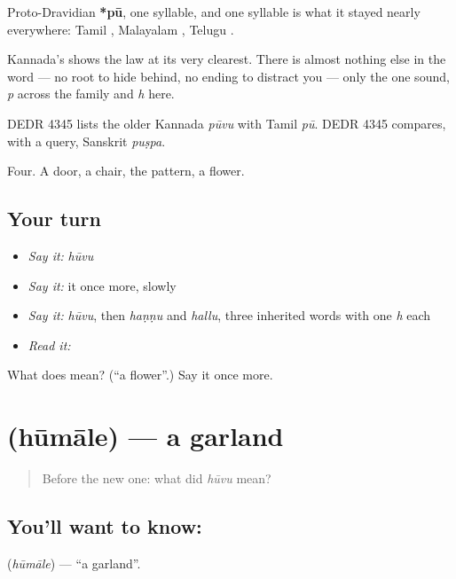 Proto-Dravidian \textbf{*pū}, one syllable, and one syllable is what it stayed nearly everywhere: Tamil , Malayalam , Telugu .

Kannada's  shows the law at its very clearest. There is almost nothing else in the word — no root to hide behind, no ending to distract you — only the one sound, \emph{p} across the family and \emph{h} here.

DEDR 4345 lists the older Kannada \emph{pūvu} with Tamil \emph{pū}. DEDR 4345 compares, with a query, Sanskrit \emph{puṣpa}.

\begin{grammarlens}[title={What you've built}]
Four. A door, a chair, the pattern, a flower.
\end{grammarlens}

\subsection*{Your turn}
\begin{itemize}
\raggedright
  \item \emph{Say it:} \emph{hūvu}
  \item \emph{Say it:} it once more, slowly
  \item \emph{Say it:} \emph{hūvu}, then \emph{haṇṇu} and \emph{hallu}, three inherited words with one \emph{h} each
  \item \emph{Read it:} \textbf{}
\end{itemize}

\begin{tcolorbox}[breakable,colback=teal!4,colframe=teal!35!black,title={Before you move on}]
What does  mean? (\textquotedblleft{}a flower\textquotedblright{}.) Say it once more.
\end{tcolorbox}
\section[\texorpdfstring{\kn{ಹೂಮಾಲೆ} (hūmāle)}{ಹೂಮಾಲೆ (hūmāle)}]{ (hūmāle) — a garland}

\label{lesson:KA-C52-garland}



\begin{quote}
Before the new one: what did \emph{hūvu} mean?
\end{quote}

\subsection*{You'll want to know: }
\textbf{} (\emph{hūmāle}) — \textquotedblleft{}a garland\textquotedblright{}.

